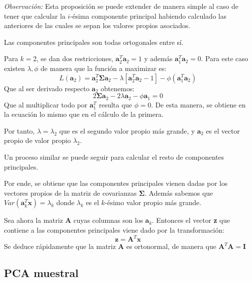\noindent \emph{Observación: } Esta proposición se puede extender de manera simple al caso de tener que calcular la $i$-ésima componente principal habiendo calculado las anteriores de las cuales se sepan los valores propios asociados. 

\begin{coro}
Las componentes principales son todas ortogonales entre sí. 
\end{coro}

\noindent Para $k=2$, se dan dos restricciones, $\textbf{a}_2^T\textbf{a}_2=1$ y además $\textbf{a}_1^T \textbf{a}_2=0$. Para este caso existen $\lambda, \phi$ de manera que la función a maximizar es:
\begin{equation}
 L(\textbf{a}_2)=\textbf{a}_2^T \mathbf{\Sigma} \textbf{a}_2 - \lambda[\textbf{a}_2^T \textbf{a}_2-1]-\phi(\textbf{a}_1^T \textbf{a}_2)
\end{equation}
Que al ser derivado respecto $\textbf{a}_2$ obtenemos:
\begin{equation}
2\mathbf{\Sigma} \textbf{a}_2 - 2\lambda\textbf{a}_2-\phi \textbf{a}_1=0
\end{equation}
Que al multiplicar todo por $\textbf{a}_1^T$ resulta que $\phi=0$. De esta manera, se obtiene en la ecuación lo mismo que en el cálculo de la primera. 

\noindent Por tanto, $\lambda=\lambda_2$ que es el segundo valor propio más grande, y $\textbf{a}_2$ es el vector propio de valor propio $\lambda_2$.

\noindent Un proceso similar se puede seguir para calcular el resto de componentes principales. 

\noindent Por ende, se obtiene que las componentes principales vienen dadas por los vectores propios de la matriz de covarianzas $\mathbf{\Sigma} $. Además sabemos que $Var(\textbf{a}_k^T \textbf{x})=\lambda_k$ donde $\lambda_k$ es el $k$-ésimo valor propio más grande. 

\noindent Sea ahora la matriz $\textbf{A}$ cuyas columnas son los $\textbf{a}_k$. Entonces el vector \textbf{z} que contiene a las componentes principales viene dado por la transformación:
\begin{equation}
\textbf{z}=\textbf{A}^T\textbf{x}
\end{equation}
\noindent Se deduce rápidamente que la matriz $\textbf{A}$ es ortonormal, de manera que $\textbf{A}^T\textbf{A}=\textbf{I}$

\subsection{PCA muestral}

